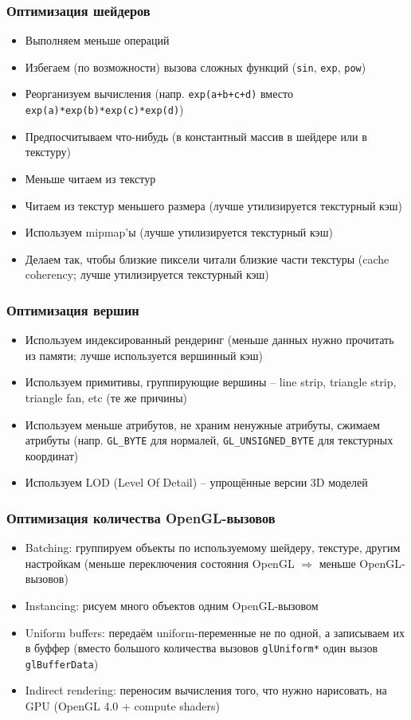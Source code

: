 \documentclass{beamer}
\begin{document}
\begin{frame}[fragile]
\fontsize{10pt}{10pt}
\frametitle{Оптимизация шейдеров}
\begin{itemize}
\item Выполняем меньше операций
\pause
\item Избегаем (по возможности) вызова сложных функций (\verb|sin|, \verb|exp|, \verb|pow|)
\pause
\item Реорганизуем вычисления (напр. \verb|exp(a+b+c+d)| вместо \verb|exp(a)*exp(b)*exp(c)*exp(d)|)
\pause
\item Предпосчитываем что-нибудь (в константный массив в шейдере или в текстуру)
\pause
\item Меньше читаем из текстур
\pause
\item Читаем из текстур меньшего размера (лучше утилизируется текстурный кэш)
\pause
\item Используем mipmap'ы (лучше утилизируется текстурный кэш)
\pause
\item Делаем так, чтобы близкие пиксели читали близкие части текстуры (cache coherency; лучше утилизируется текстурный кэш)
\end{itemize}
\end{frame}

\begin{frame}[fragile]
\frametitle{Оптимизация вершин}
\begin{itemize}
\item Используем индексированный рендеринг (меньше данных нужно прочитать из памяти; лучше используется вершинный кэш)
\pause
\item Используем примитивы, группирующие вершины -- line strip, triangle strip, triangle fan, etc (те же причины)
\pause
\item Используем меньше атрибутов, не храним ненужные атрибуты, сжимаем атрибуты (напр. \verb|GL_BYTE| для нормалей, \verb|GL_UNSIGNED_BYTE| для текстурных координат)
\pause
\item Используем LOD (Level Of Detail) -- упрощённые версии 3D моделей
\end{itemize}
\end{frame}

\begin{frame}[fragile]
\frametitle{Оптимизация количества OpenGL-вызовов}
\begin{itemize}
\item Batching: группируем объекты по используемому шейдеру, текстуре, другим настройкам (меньше переключения состояния OpenGL \begin{math}\Rightarrow\end{math} меньше OpenGL-вызовов)
\pause
\item Instancing: рисуем много объектов одним OpenGL-вызовом
\pause
\item Uniform buffers: передаём uniform-переменные не по одной, а записываем их в буффер (вместо большого количества вызовов \verb|glUniform*| один вызов \verb|glBufferData|)
\pause
\item Indirect rendering: переносим вычисления того, что нужно нарисовать, на GPU (OpenGL 4.0 + compute shaders)
\end{itemize}
\end{frame}
\end{document}
